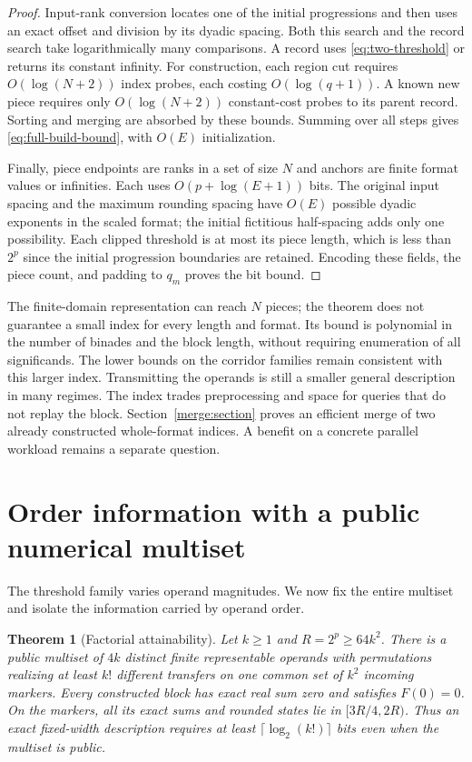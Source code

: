 \documentclass[11pt,reqno]{amsart}
\newtheorem{theorem}{Theorem}[section]
\theoremstyle{definition}
\theoremstyle{remark}
\numberwithin{equation}{section}
\begin{document}
\begin{proof}
Input-rank conversion locates one of the initial progressions and then
uses an exact offset and division by its dyadic spacing. Both this search
and the record search take logarithmically many comparisons. A record
uses \eqref{eq:two-threshold} or returns its constant infinity.
For construction, each region cut requires $O(\log(N+2))$ index probes,
each costing $O(\log(q+1))$. A known new piece requires only
$O(\log(N+2))$ constant-cost probes to its parent record. Sorting and
merging are absorbed by these bounds. Summing over all steps gives
\eqref{eq:full-build-bound}, with $O(E)$ initialization.

Finally, piece endpoints are ranks in a set of size $N$ and anchors
are finite format values or infinities. Each uses
$O(p+\log(E+1))$ bits. The original input spacing and the maximum
rounding spacing have $O(E)$ possible dyadic exponents in the scaled
format; the initial fictitious half-spacing adds only one possibility.
Each clipped threshold is at most its piece length, which is less than
$2^p$ since the initial progression boundaries are retained. Encoding
these fields, the piece count, and padding to $q_m$ proves the bit bound.
\end{proof}

The finite-domain representation can reach $N$ pieces; the theorem does
not guarantee a small index for every length and format. Its bound is
polynomial in the number of binades and the block length, without
requiring enumeration of all significands. The lower bounds on the
corridor families remain consistent with this larger index. Transmitting
the operands is still a smaller general description in many regimes.
The index trades preprocessing and space for queries that do not
replay the block. Section~\ref{merge:section} proves an efficient merge of
two already constructed whole-format indices. A benefit on a concrete
parallel workload remains a separate question.





\section{Order information with a public numerical multiset}
\label{sec:order}

The threshold family varies operand magnitudes. We now fix the entire
multiset and isolate the information carried by operand order.

\begin{theorem}[Factorial attainability]
\label{thm:factorial}
Let $k\geq 1$ and $R=2^p\geq 64k^2$. There is a public multiset of
$4k$ distinct finite representable operands with permutations realizing
at least $k!$ different transfers on one common set of $k^2$ incoming
markers. Every constructed block has exact real sum zero and satisfies
$F(0)=0$. On the markers, all its exact sums and rounded states lie in
$[3R/4,2R)$. Thus an exact fixed-width description requires at least
$\lceil\log_2(k!)\rceil$ bits even when the multiset is public.
\end{theorem}
\end{document}
